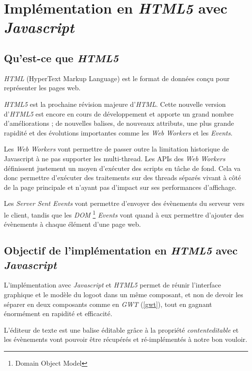 \section{Implémentation en \emph{HTML5} avec \emph{Javascript}}
	\label{sec:html5}
  \subsection{Qu'est-ce que \emph{HTML5}}
  
	\emph{HTML} (HyperText Markup Language) est le format de données conçu pour 
	représenter les pages web. 

	\emph{HTML5} est la prochaine révision majeure d'\emph{HTML}. 
	Cette nouvelle version d'\emph{HTML5} est encore en cours de 
	développement et apporte un grand nombre d'améliorations ; de nouvelles 
	balises, de nouveaux attributs, une plus grande rapidité et des	évolutions
	importantes comme les \emph{Web Workers} et les \emph{Events}.
	
	Les \emph{Web Workers} vont permettre de passer outre la limitation 
	historique de Javascript à ne pas supporter les multi-thread.
	Les APIs des \emph{Web Workers} définissent justement un moyen d’exécuter 
	des scripts en tâche de fond. Cela va donc permettre d’exécuter des 
	traitements sur des threads séparés vivant à côté de la page principale et 
	n’ayant pas d’impact sur ses performances d’affichage. 
	
	Les \emph{Server Sent Events} vont permettre d'envoyer des évènements du 
	serveur vers le client, tandis que les \emph{DOM}
	\footnote{Domain Object Model} \emph{Events} vont quand à eux	permettre 
	d'ajouter des évènements à chaque élément d'une page web.
	
	\subsection{Objectif de l'implémentation en \emph{HTML5} avec
		\emph{Javascript}}
	
	L'implémentation avec \emph{Javascript} et \emph{HTML5} permet de réunir 
	l'interface graphique et le modèle du logoot dans un même composant, et non de
	devoir les séparer en deux composants comme en \emph{GWT} (\ref{gwt}), tout en 
	gagnant énormément en rapidité et efficacité.
	
	L'éditeur de texte est une balise éditable grâce à la propriété 
	\emph{contenteditable} et les évènements vont pouvoir être récupérés et 
	ré-implémentés à notre bon vouloir.
	
